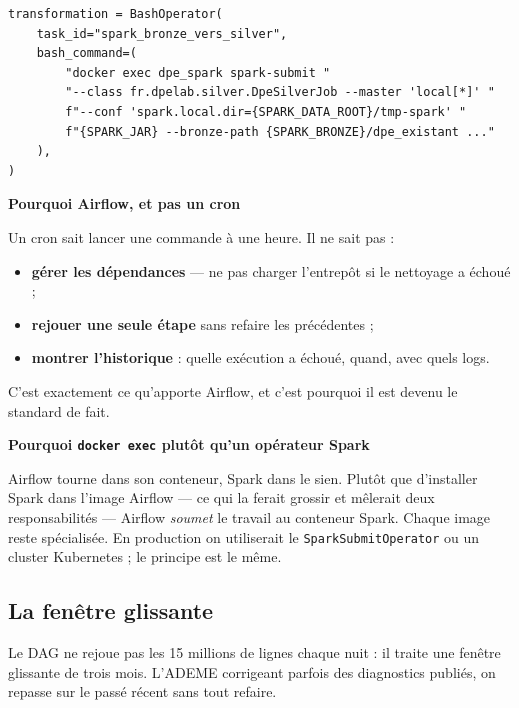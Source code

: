 \documentclass[11pt,a4paper]{article}
\newcommand{\cmd}[1]{\texttt{\small #1}}
\newcommand{\titrebloc}[1]{\textbf{\color{encre}#1}\par\vspace{0.25em}}
\begin{document}
\begin{lstlisting}[style=py]
transformation = BashOperator(
    task_id="spark_bronze_vers_silver",
    bash_command=(
        "docker exec dpe_spark spark-submit "
        "--class fr.dpelab.silver.DpeSilverJob --master 'local[*]' "
        f"--conf 'spark.local.dir={SPARK_DATA_ROOT}/tmp-spark' "
        f"{SPARK_JAR} --bronze-path {SPARK_BRONZE}/dpe_existant ..."
    ),
)
\end{lstlisting}

\begin{pourquoi}
\titrebloc{Pourquoi Airflow, et pas un cron}
Un cron sait lancer une commande à une heure. Il ne sait pas :

\begin{itemize}
  \item \textbf{gérer les dépendances} — ne pas charger l'entrepôt si le
        nettoyage a échoué ;
  \item \textbf{rejouer une seule étape} sans refaire les précédentes ;
  \item \textbf{montrer l'historique} : quelle exécution a échoué, quand,
        avec quels logs.
\end{itemize}

C'est exactement ce qu'apporte Airflow, et c'est pourquoi il est devenu le
standard de fait.
\end{pourquoi}

\begin{attention}
\titrebloc{Pourquoi \cmd{docker exec} plutôt qu'un opérateur Spark}
Airflow tourne dans son conteneur, Spark dans le sien. Plutôt que d'installer
Spark dans l'image Airflow — ce qui la ferait grossir et mêlerait deux
responsabilités — Airflow \emph{soumet} le travail au conteneur Spark. Chaque
image reste spécialisée. En production on utiliserait le
\cmd{SparkSubmitOperator} ou un cluster Kubernetes ; le principe est le même.
\end{attention}

\subsection{La fenêtre glissante}

Le DAG ne rejoue pas les 15 millions de lignes chaque nuit : il traite une
fenêtre glissante de trois mois. L'ADEME corrigeant parfois des diagnostics
publiés, on repasse sur le passé récent sans tout refaire.

\newpage
\end{document}
